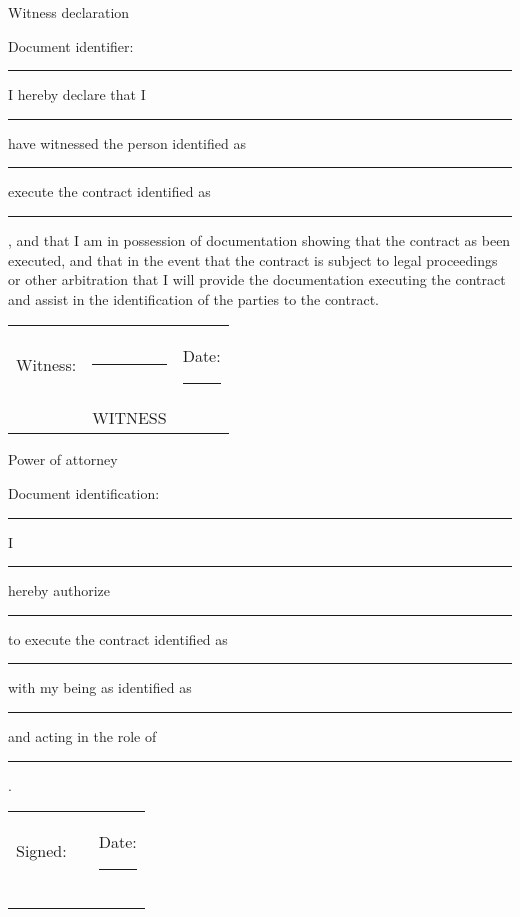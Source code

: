 \documentclass[10pt]{article}
\begin{document}
\pagebreak

\begin{center}
{Witness declaration}
\end{center}

Document identifier: \rule{10cm}{.2pt}

\vspace{1cm}

I hereby declare that I \rule{5cm}{.2pt} have witnessed the person
identified as \rule{5cm}{.2pt} execute the contract identified as
\rule{5cm}{.2pt}, and that I am in possession of documentation showing
that the contract as been executed, and that in the event that the
contract is subject to legal proceedings or other arbitration that I
will provide the documentation executing the contract and assist in
the identification of the parties to the contract.

\vspace{1cm}

\noindent \begin{tabular}{l l l}
Witness:          & \rule{6cm}{.2pt} & Date: \rule{2.4cm}{.2pt}\\
                         & WITNESS      & \\

\end{tabular}

\pagebreak

\begin{center}
{Power of attorney}
\end{center}

Document identification: \rule{10cm}{.2pt}

\vspace{1cm}

I \rule{5cm}{.2pt} hereby authorize \rule{5cm}{.2pt} to execute the
contract identified as \rule{5cm}{.2pt} with my being as identified as
\rule{5cm}{.2pt} and acting in the role of \rule{5cm}{.2pt}. 

\vspace{1cm}

\noindent \begin{tabular}{l l l}
Signed: & \rule{6cm}{.2pt} & Date: \rule{2.4cm}{.2pt}\\
                         &       & \\\\\\
\end{tabular}
\end{document}
